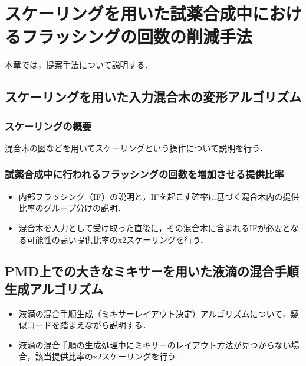 \chapter{スケーリングを用いた試薬合成中におけるフラッシングの回数の削減手法}
本章では，提案手法について説明する．

\section{スケーリングを用いた入力混合木の変形アルゴリズム}
\subsection{スケーリングの概要}
混合木の図などを用いてスケーリングという操作について説明を行う．
\subsection{試薬合成中に行われるフラッシングの回数を増加させる提供比率}
\begin{itemize}
\item 内部フラッシング（IF）の説明と，IFを起こす確率に基づく混合木内の提供比率のグループ分けの説明\cite{1}\cite{2}．
\item 混合木を入力として受け取った直後に，その混合木に含まれるIFが必要となる可能性の高い提供比率のx2スケーリングを行う．
\end{itemize}

\section{PMD上での大きなミキサーを用いた液滴の混合手順生成アルゴリズム}
\begin{itemize}
\item 液滴の混合手順生成（ミキサーレイアウト決定）アルゴリズムについて，疑似コードを踏まえながら説明する．
\item 液滴の混合手順の生成処理中にミキサーのレイアウト方法が見つからない場合，該当提供比率のx2スケーリングを行う.
\end{itemize}
